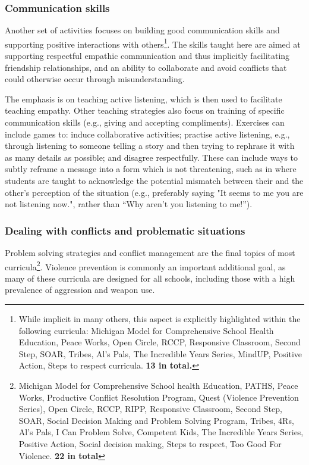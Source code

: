 \documentclass[prodmode,acmtochi]{acmsmall}
\newcommand{\todo}[1]{\textrm{\textrm{\textcolor{LightBlue}{[[#1]]}}}}
\begin{document}
\subsubsection{Communication skills}%
Another set of activities focuses on building good communication skills and supporting positive interactions with others\footnote{While implicit in many others, this aspect is explicitly highlighted within the following curricula: Michigan Model for Comprehensive School Health Education, Peace  Works, Open Circle, RCCP, Responsive Classroom, Second Step, SOAR, Tribes, Al's Pals, The Incredible Years Series, MindUP, Positive Action, Steps to respect curricula. {\bf 13 in total.}}. The skills taught here are aimed at supporting respectful empathic communication and thus implicitly facilitating friendship relationships, and an ability to collaborate and avoid conflicts that could otherwise occur through misunderstanding. 

The emphasis is on teaching active listening, which is then used to facilitate teaching empathy. Other teaching strategies also focus on training of specific communication skills (e.g., giving and accepting compliments).
Exercises can include games to: induce collaborative activities; practise active listening, e.g., through listening to someone telling a story and then trying to rephrase it with as many details as possible; and disagree respectfully. These can include ways to subtly reframe a message into a form which is not threatening, such as in  where students are taught to acknowledge the potential mismatch between their and the other's perception of the situation (e.g., preferably saying "It seems to me you are not listening now.", rather than ``Why aren't you listening to me!'').%

\subsubsection{Dealing with conflicts and problematic situations} 
Problem solving strategies and conflict management are the final topics of most curricula\footnote{Michigan Model for Comprehensive School health Education, PATHS, Peace Works, Productive Conflict Resolution Program, Quest (Violence Prevention Series), Open Circle, RCCP, RIPP, Responsive Classroom, Second Step, SOAR, Social Decision Making and Problem Solving Program, Tribes, 4Rs, Al's Pals, I Can Problem Solve, Competent Kids, The Incredible Years Series, Positive Action, Social decision making, Steps to respect, Too Good For Violence. {\bf 22 in total}}.  Violence prevention is commonly an important additional goal, as many of these curricula are designed  for all schools, including those with a high prevalence of aggression and weapon use. 
\end{document}
